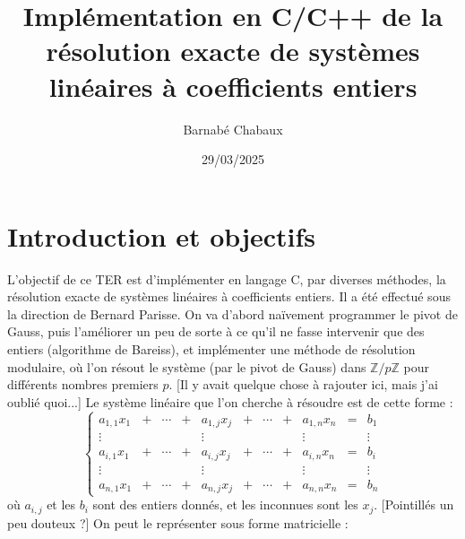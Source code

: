\documentclass[french]{article}
\title{Implémentation en C/C++ de la résolution exacte de systèmes linéaires à coefficients entiers}
\date{29/03/2025}
\author{Barnabé Chabaux}
\begin{document}
\maketitle
\tableofcontents
\section{Introduction et objectifs} \label{sec:intro}
L'objectif de ce TER est d'implémenter en langage C, par diverses méthodes, la résolution exacte de systèmes linéaires à coefficients entiers. Il a été effectué sous la direction de Bernard Parisse.
\newline
On va d'abord naïvement programmer le pivot de Gauss, puis l'améliorer un peu de sorte à ce qu'il ne fasse intervenir que des entiers (algorithme de Bareiss), et implémenter une méthode de résolution modulaire, où l'on résout le système (par le pivot de Gauss) dans $\mathbb{Z}/p\mathbb{Z}$ pour différents nombres premiers $p$. [Il y avait quelque chose à rajouter ici, mais j'ai oublié quoi...]
\newline
Le système linéaire que l'on cherche à résoudre est de cette forme :
\newline
$$\left \{
\begin{array}{ccccccccccc}
	a_{1,1} x_1 &+ &\cdots &+ &a_{1,j} x_j &+ &\cdots &+ &a_{1,n} x_n &= & b_1\\
	\vdots & & & & \vdots & & & & \vdots & & \vdots\\
	a_{i,1} x_1 &+ &\cdots &+ &a_{i,j} x_j &+ &\cdots &+ &a_{i,n} x_n &= & b_i\\
	\vdots & & & & \vdots & & & & \vdots & & \vdots\\
	a_{n,1} x_1 &+ &\cdots &+ &a_{n,j} x_j &+ &\cdots &+ &a_{n,n} x_n &= & b_n
\end{array}
\right.
$$
où $a_{i,j}$ et les $b_i$ sont des entiers donnés, et les inconnues sont les $x_j$. [Pointillés un peu douteux ?]
\newline
On peut le représenter sous forme matricielle :
\end{document}
